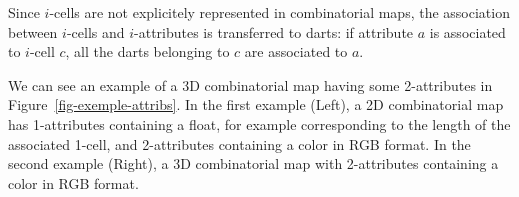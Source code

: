 Since $i$-cells are not explicitely represented in combinatorial maps,
the association between $i$-cells and $i$-attributes is transferred to
darts: if attribute $a$ is associated to $i$-cell $c$, all the darts
belonging to $c$ are associated to $a$.


We can see an example of a 3D combinatorial map having some
2-attributes in Figure~\ref{fig-exemple-attribs}. In the first example
(Left), a 2D combinatorial map has 1-attributes containing a float,
for example corresponding to the length of the associated 1-cell, and
2-attributes containing a color in RGB format.  In the second example
(Right), a 3D combinatorial map with 2-attributes containing a color
in RGB format.
%
